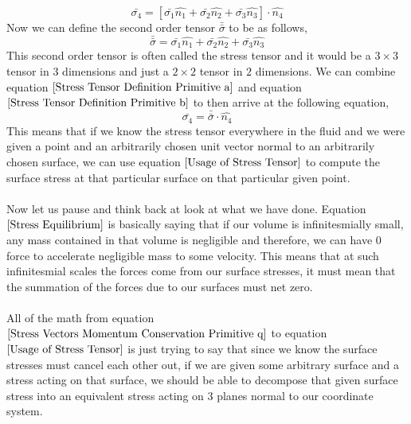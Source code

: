 
\begin{equation}\bar{\sigma_{4}} = [\bar{\sigma_{1}}\hat{n_{1}} + \bar{\sigma_{2}}\hat{n_{2}} + \bar{\sigma_{3}}\hat{n_{3}}] \cdot \hat{n_{4}} \label{Stress Tensor Definition Primitive b}\end{equation}
Now we can define the second order tensor $\bar{\bar{\sigma}}$ to be as follows,
\begin{equation}\bar{\bar{\sigma}} = \bar{\sigma_{1}}\hat{n_{1}} + \bar{\sigma_{2}}\hat{n_{2}} + \bar{\sigma_{3}}\hat{n_{3}} \label{Stress Tensor Definition Primitive a}\end{equation}
This second order tensor is often called the stress tensor and it would be a $3\times 3$ tensor in $3$ dimensions and just a $2\times 2$ tensor in $2$ dimensions.
We can combine equation $\ref{Stress Tensor Definition Primitive a}$ and equation $\ref{Stress Tensor Definition Primitive b}$ to then arrive at the following equation,
\begin{equation}\bar{\sigma_{4}} = \bar{\bar{\sigma}}\cdot \hat{n_{4}} \label{Usage of Stress Tensor}\end{equation}
This means that if we know the stress tensor everywhere in the fluid and we were given a point and an arbitrarily chosen unit vector normal to an arbitrarily chosen surface, we can use equation $\ref{Usage of Stress Tensor}$ to compute the surface stress at that particular surface on that particular given point.
\\~\\Now let us pause and think back at look at what we have done.
Equation $\ref{Stress Equilibrium}$ is basically saying that if our volume is infinitesmially small, any mass contained in that volume is negligible and therefore, we can have $0$ force to accelerate negligible mass to some velocity.
This means that at such infinitesmial scales the forces come from our surface stresses, it must mean that the summation of the forces due to our surfaces must net zero.
\\~\\All of the math from equation $\ref{Stress Vectors Momentum Conservation Primitive q}$ to equation $\ref{Usage of Stress Tensor}$ is just trying to say that since we know the surface stresses must cancel each other out, if we are given some arbitrary surface and a stress acting on that surface, we should be able to decompose that given surface stress into an equivalent stress acting on $3$ planes normal to our coordinate system.

